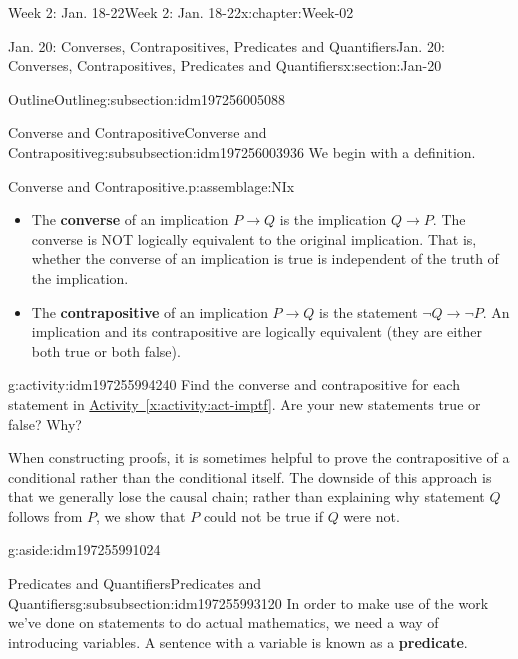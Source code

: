 \documentclass[oneside,10pt,]{book}
\newcommand{\xreffont}{\relax}
\newcommand{\terminology}[1]{\textbf{#1}}
\numberwithin{equation}{section}
\def\imp{\to}
\newcommand{\imp}{\rightarrow}
\begin{document}
\begin{chapterptx}{Week 2: Jan. 18-22}{}{Week 2: Jan. 18-22}{}{}{x:chapter:Week-02}
\begin{sectionptx}{Jan. 20: Converses, Contrapositives, Predicates and Quantifiers}{}{Jan. 20: Converses, Contrapositives, Predicates and Quantifiers}{}{}{x:section:Jan-20}
\begin{subsectionptx}{Outline}{}{Outline}{}{}{g:subsection:idm197256005088}
%
%
\typeout{************************************************}
\typeout{************************************************}
%
\begin{subsubsectionptx}{Converse and Contrapositive}{}{Converse and Contrapositive}{}{}{g:subsubsection:idm197256003936}
We begin with a definition.%
\begin{assemblage}{Converse and Contrapositive.}{p:assemblage:NIx}%
%
\begin{itemize}[label=\textbullet]
\item{}The \terminology{converse}  of an implication \(P \imp Q\) is the implication \(Q \imp P\). The converse is NOT logically equivalent to the original implication. That is, whether the converse of an implication is true is independent of the truth of the implication.%
\item{}The \terminology{contrapositive}  of an implication \(P \imp Q\) is the statement \(\neg Q \imp \neg P\). An implication and its contrapositive are logically equivalent (they are either both true or both false).%
\end{itemize}
%
\end{assemblage}
\begin{activity}{}{g:activity:idm197255994240}%
Find the converse and contrapositive for each statement in \hyperref[x:activity:act-imptf]{Activity~{\xreffont\ref{x:activity:act-imptf}}}. Are your new statements true or false? Why?%
\end{activity}%
When constructing proofs, it is sometimes helpful to prove the contrapositive of a conditional rather than the conditional itself. The downside of this approach is that we generally lose the causal chain; rather than explaining why statement \(Q\) follows from \(P\), we show that \(P\) could not be true if \(Q\) were not. \begin{aside}{}{g:aside:idm197255991024}%
\end{aside}
%
\end{subsubsectionptx}
%
%
\typeout{************************************************}
\typeout{************************************************}
%
\begin{subsubsectionptx}{Predicates and Quantifiers}{}{Predicates and Quantifiers}{}{}{g:subsubsection:idm197255993120}
In order to make use of the work we've done on statements to do actual mathematics, we need a way of introducing variables. A sentence with a variable is known as a \terminology{predicate}.%

\end{subsubsectionptx}
\end{subsectionptx}
\end{sectionptx}
\end{chapterptx}
\end{document}
